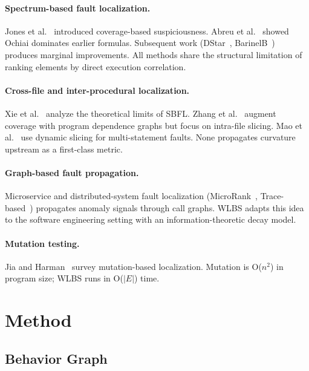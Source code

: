 \documentclass[acmtog]{acmart}
\begin{document}
\paragraph{Spectrum-based fault localization.}
Jones et al.~\cite{jones2002visualization} introduced coverage-based suspiciousness.
Abreu et al.~\cite{abreu2007accuracy} showed Ochiai dominates earlier formulas.
Subsequent work (DStar~\cite{wong2014dstar}, BarinelB~\cite{lucia2014extended})
produces marginal improvements. All methods share the structural limitation of
ranking elements by direct execution correlation.

\paragraph{Cross-file and inter-procedural localization.}
Xie et al.~\cite{xie2013theoretical} analyze the theoretical limits of SBFL.
Zhang et al.~\cite{zhang2017boosting} augment coverage with program dependence
graphs but focus on intra-file slicing. Mao et al.~\cite{mao2014slice} use
dynamic slicing for multi-statement faults. None propagates curvature upstream
as a first-class metric.

\paragraph{Graph-based fault propagation.}
Microservice and distributed-system fault localization
(MicroRank~\cite{yu2021microrank}, Trace-based~\cite{chen2014causeinfer})
propagates anomaly signals through call graphs. WLBS adapts this idea to
the software engineering setting with an information-theoretic decay model.

\paragraph{Mutation testing.}
Jia and Harman~\cite{jia2011analysis} survey mutation-based localization.
Mutation is O($n^2$) in program size; WLBS runs in O($|E|$) time.

\section{Method}\label{sec:method}

\subsection{Behavior Graph}
\end{document}

